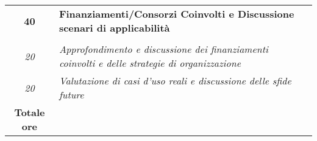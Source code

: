 \begin{tabularx}{\textwidth}{|c|X|}
    \textbf{40} & \textbf{Finanziamenti/Consorzi Coinvolti e Discussione scenari di applicabilità} \\ \hdashline 
    \multirow{2}{0cm}\\ 
    \textit{20} & 
    \textit{Approfondimento e discussione dei finanziamenti coinvolti e delle strategie di organizzazione} \\
    \textit{20} & 
    \textit{Valutazione di casi d'uso reali e discussione delle sfide future} \\
    \hline
	
	\textbf{Totale ore} & \multicolumn{1}{|c|}{\textbf{\totaleOre}} \\\hline
	
	
\end{tabularx}